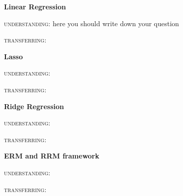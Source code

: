 \documentclass{article}
\begin{document}
\thispagestyle{empty}


\textbf{Linear Regression}

\textsc{understanding:} here you should write down your question

\textsc{transferring:}




\vspace{10mm}
\textbf{Lasso}

\textsc{understanding:} 

\textsc{transferring:}



\vspace{10mm}
\textbf{Ridge Regression}

\textsc{understanding:} 

\textsc{transferring:}



\vspace{10mm}
\textbf{ERM and RRM framework}

\textsc{understanding:} 

\textsc{transferring:}
\end{document}
